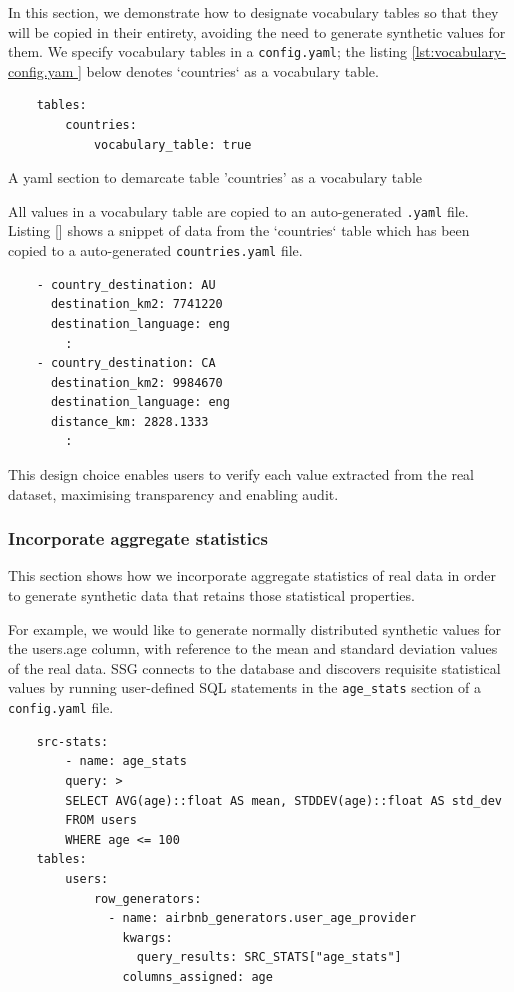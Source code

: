 \documentclass[11pt]{article}
\begin{document}
In this section, we demonstrate how to designate vocabulary tables so that they will be copied in their entirety, avoiding the need to generate synthetic values for them. We specify vocabulary tables in a \texttt{config.yaml}; the listing \ref{lst:vocabulary-config.yam } below denotes `countries` as a vocabulary table.

\begin{listing}
\begin{verbatim}
    tables:
        countries:
            vocabulary_table: true
\end{verbatim}
\caption{A yaml section to demarcate table 'countries' as a vocabulary table}
\label{lst:vocabulary-config.yam }
\end{listing}

All values in a vocabulary table are copied to an auto-generated \texttt{.yaml} file. Listing [] shows a snippet of data from the `countries` table which has been copied to a auto-generated \texttt{countries.yaml} file.

\begin{verbatim}
    - country_destination: AU
      destination_km2: 7741220
      destination_language: eng
        :
    - country_destination: CA
      destination_km2: 9984670
      destination_language: eng
      distance_km: 2828.1333
        :
\end{verbatim}

This design choice enables users to verify each value extracted from the real dataset, maximising transparency and enabling audit.

\subsubsection{Incorporate aggregate statistics}

This section shows how we incorporate aggregate statistics of real data in order to generate synthetic data that retains those statistical properties.

For example, we would like to generate normally distributed synthetic values for the users.age column, with reference to the mean and standard deviation values of the real data. SSG connects to the database and discovers requisite statistical values by running user-defined SQL statements in the \texttt{age\_stats} section of a \texttt{config.yaml} file.

\begin{verbatim}
    src-stats:
        - name: age_stats
        query: >
        SELECT AVG(age)::float AS mean, STDDEV(age)::float AS std_dev
        FROM users
        WHERE age <= 100
    tables:
        users:
            row_generators:
              - name: airbnb_generators.user_age_provider
                kwargs:
                  query_results: SRC_STATS["age_stats"]
                columns_assigned: age
\end{verbatim}
\end{document}
